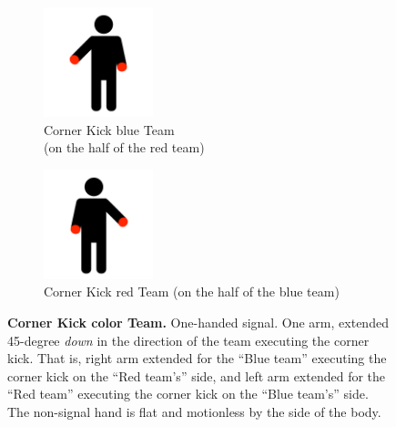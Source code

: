 \begin{figure}[ht!]
    \centering
    \begin{subfigure}{.33\textwidth}
        \centering
        \includegraphics[height=120px]{figs/technical_challenges/corner-kick.png}
        \caption{{\color{blue}Corner Kick \textlangle{}blue\textrangle{} Team}\\ (on the half of the {\color{red} red} team)}
    \end{subfigure}
    \begin{subfigure}{.33\textwidth}
        \centering
        \includegraphics[height=120px]{figs/technical_challenges/corner-kick-flipped.png}
        \caption{{\color{red}Corner Kick \textlangle{}red\textrangle{} Team} (on the half of the {\color{blue} blue} team)}
    \end{subfigure}
    \caption{\textbf{Corner Kick \textlangle{}color\textrangle{} Team.} One-handed signal. One arm, extended 45-degree \emph{down} in the direction of the team executing the corner kick. That is, right arm extended for the ``Blue team'' executing the corner kick on the ``Red team's'' side, and left arm extended for the ``Red team'' executing the corner kick on the ``Blue team's'' side. The non-signal hand is flat and motionless by the side of the body.}
\end{figure}
    
